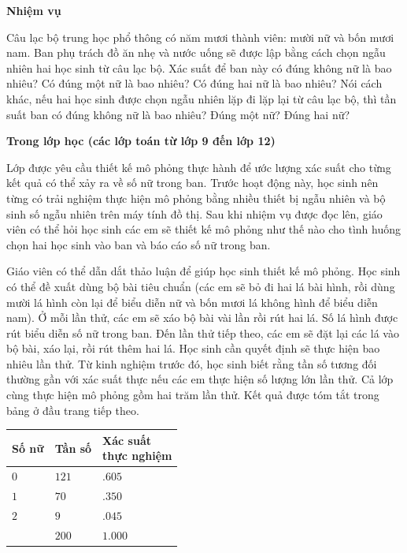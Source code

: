   {
    \textbf{Nhiệm vụ}

    Câu lạc bộ trung học phổ thông có năm mươi thành viên: mười nữ và bốn mươi nam. Ban phụ trách đồ ăn nhẹ và nước uống sẽ được lập bằng cách chọn ngẫu nhiên hai học sinh từ câu lạc bộ. Xác suất để ban này có đúng không nữ là bao nhiêu? Có đúng một nữ là bao nhiêu? Có đúng hai nữ là bao nhiêu? Nói cách khác, nếu hai học sinh được chọn ngẫu nhiên lặp đi lặp lại từ câu lạc bộ, thì tần suất ban có đúng không nữ là bao nhiêu? Đúng một nữ? Đúng hai nữ?

    \textbf{Trong lớp học (các lớp toán từ lớp 9 đến lớp 12)}

    Lớp được yêu cầu thiết kế mô phỏng thực hành để ước lượng xác suất cho từng kết quả có thể xảy ra về số nữ trong ban. Trước hoạt động này, học sinh nên từng có trải nghiệm thực hiện mô phỏng bằng nhiều thiết bị ngẫu nhiên và bộ sinh số ngẫu nhiên trên máy tính đồ thị. Sau khi nhiệm vụ được đọc lên, giáo viên có thể hỏi học sinh các em sẽ thiết kế mô phỏng như thế nào cho tình huống chọn hai học sinh vào ban và báo cáo số nữ trong ban.\vspace{3\baselineskip}

    Giáo viên có thể dẫn dắt thảo luận để giúp học sinh thiết kế mô phỏng. Học sinh có thể đề xuất dùng bộ bài tiêu chuẩn (các em sẽ bỏ đi hai lá bài hình, rồi dùng mười lá hình còn lại để biểu diễn nữ và bốn mươi lá không hình để biểu diễn nam). Ở mỗi lần thử, các em sẽ xáo bộ bài vài lần rồi rút hai lá. Số lá hình được rút biểu diễn số nữ trong ban. Đến lần thử tiếp theo, các em sẽ đặt lại các lá vào bộ bài, xáo lại, rồi rút thêm hai lá. Học sinh cần quyết định sẽ thực hiện bao nhiêu lần thử. Từ kinh nghiệm trước đó, học sinh biết rằng tần số tương đối thường gần với xác suất thực nếu các em thực hiện số lượng lớn lần thử. Cả lớp cùng thực hiện mô phỏng gồm hai trăm lần thử. Kết quả được tóm tắt trong bảng ở đầu trang tiếp theo.\vspace*{2\baselineskip}

    \begin{center}
    \begin{tabular}{|
    >{\centering\arraybackslash}m{1.8cm}|
    >{\centering\arraybackslash}m{1.8cm}|
    >{\centering\arraybackslash}m{3.0cm}|}
    \hline
    Số nữ & Tần số & \shortstack{Xác suất\\thực nghiệm} \\
    \hline
    $0$ & $121$ & $.605$ \\
    \hline
    $1$ & $70$  & $.350$ \\
    \hline
    $2$ & $9$   & $.045$ \\
    \hline
        & $200$ & $1.000$ \\
    \hline
    \end{tabular}
    \end{center}

}
